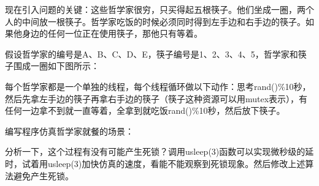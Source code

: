 现在引入问题的关键：这些哲学家很穷，只买得起五根筷子。他们坐成一圈，两个人的中间放一根筷子。哲学家吃饭的时候必须同时得到左手边和右手边的筷子。如果他身边的任何一位正在使用筷子，那他只有等着。



假设哲学家的编号是A、B、C、D、E，筷子编号是1、2、3、4、5，哲学家和筷子围成一圈如下图所示：




每个哲学家都是一个单独的线程，每个线程循环做以下动作：思考rand()\%10秒，然后先拿左手边的筷子再拿右手边的筷子（筷子这种资源可以用mutex表示），有任何一边拿不到就一直等着，全拿到就吃饭rand()\%10秒，然后放下筷子。



编写程序仿真哲学家就餐的场景：




分析一下，这个过程有没有可能产生死锁？调用usleep(3)函数可以实现微秒级的延时，试着用usleep(3)加快仿真的速度，看能不能观察到死锁现象。然后修改上述算法避免产生死锁。


